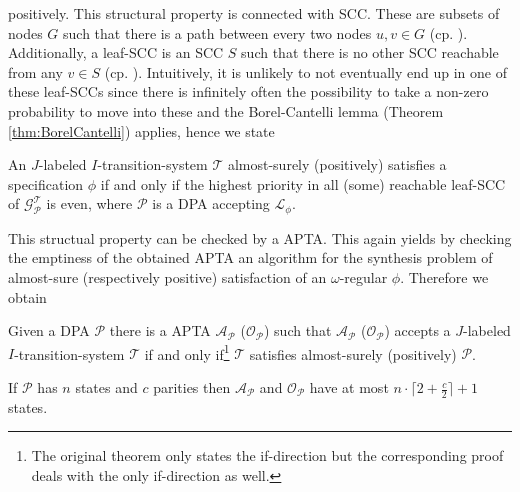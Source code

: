 positively. This structural property is connected with \ac{SCC}. These are 
subsets of nodes $G$ such that there is a path between every two nodes 
$u,v\in G$ (cp. \cite{Tarjan}). Additionally, a leaf-\ac{SCC} is an \ac{SCC} 
$S$ such that there is no other \ac{SCC} reachable from any $v\in S$ (cp. 
\cite[Bottom-\ac{SCC}]{ComplexProbVerification}). Intuitively, it is unlikely 
to not eventually end up in one of these leaf-\acp{SCC} since there is 
infinitely often the possibility to take a non-zero probability to move into 
these and the Borel-Cantelli lemma (Theorem \ref{thm:BorelCantelli}) applies,
hence we state
\begin{lemma}
  \cite[Lemma 1]{SynProbEnv}
  An $J$-labeled $I$-transition-system $\mathcal{T}$ almost-surely (positively)
  satisfies a specification $\phi$ if and only if the highest priority in all
  (some) reachable leaf-\ac{SCC} of $\mathcal{G}_{\mathcal{P}}^{\mathcal{T}}$
  is even, where $\mathcal{P}$ is a \ac{DPA} accepting $\mathcal{L}_{\phi}$.
\end{lemma}
This structual property can be checked by a \ac{APTA}. This again yields by
checking the emptiness of the obtained \ac{APTA} an algorithm for the synthesis
problem of almost-sure (respectively positive) satisfaction of an 
$\omega$-regular $\phi$. Therefore we obtain
\begin{theorem}
  \cite[Theorem 1]{SynProbEnv}
  Given a \ac{DPA} $\mathcal{P}$ there is a \ac{APTA} 
  $\mathcal{A}_{\mathcal{P}}$ ($\mathcal{O}_{\mathcal{P}}$) such that 
  $\mathcal{A}_{\mathcal{P}}$ ($\mathcal{O}_{\mathcal{P}}$) accepts a 
  $J$-labeled $I$-transition-system $\mathcal{T}$ if and only 
  if\footnote{The original theorem only states the if-direction but the 
  corresponding proof deals with the only if-direction as well.} $\mathcal{T}$ 
  satisfies almost-surely (positively) $\mathcal{P}$.

  If $\mathcal{P}$ has $n$ states and $c$ parities then 
  $\mathcal{A}_{\mathcal{P}}$ and $\mathcal{O}_{\mathcal{P}}$ have at most
  $n\cdot\lceil 2 + \frac{c}{2}\rceil + 1$ states.
  \label{thm:probenvsynthesis}
\end{theorem}
